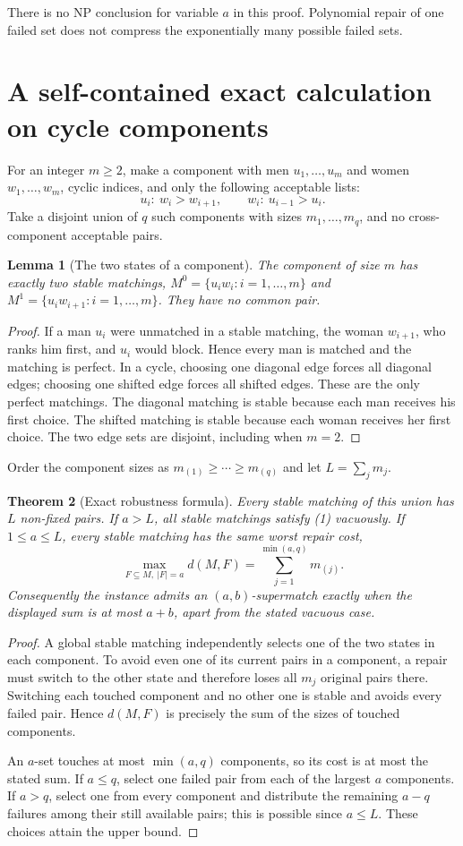 \documentclass[11pt,a4paper]{article}
\newtheorem{theorem}{Theorem}[section]
\newtheorem{lemma}[theorem]{Lemma}
\theoremstyle{definition}
\theoremstyle{remark}
\begin{document}
There is no NP conclusion for variable $a$ in this proof. Polynomial repair of one failed set does not compress the exponentially many possible failed sets.

\section{A self-contained exact calculation on cycle components}
For an integer $m\ge2$, make a component with men $u_1,\ldots,u_m$ and women $w_1,\ldots,w_m$, cyclic indices, and only the following acceptable lists:
\[
 u_i:\ w_i>w_{i+1},\qquad
 w_i:\ u_{i-1}>u_i.
\]
Take a disjoint union of $q$ such components with sizes $m_1,\ldots,m_q$, and no cross-component acceptable pairs.

\begin{lemma}[The two states of a component]
The component of size $m$ has exactly two stable matchings,
$M^0=\{u_iw_i:i=1,\ldots,m\}$ and
$M^1=\{u_iw_{i+1}:i=1,\ldots,m\}$.
They have no common pair.
\end{lemma}
\begin{proof}
If a man $u_i$ were unmatched in a stable matching, the woman $w_{i+1}$, who ranks him first, and $u_i$ would block. Hence every man is matched and the matching is perfect. In a cycle, choosing one diagonal edge forces all diagonal edges; choosing one shifted edge forces all shifted edges. These are the only perfect matchings. The diagonal matching is stable because each man receives his first choice. The shifted matching is stable because each woman receives her first choice. The two edge sets are disjoint, including when $m=2$.
\end{proof}

Order the component sizes as $m_{(1)}\ge\cdots\ge m_{(q)}$ and let $L=\sum_jm_j$.
\begin{theorem}[Exact robustness formula]
Every stable matching of this union has $L$ non-fixed pairs. If $a>L$, all stable matchings satisfy (1) vacuously. If $1\le a\le L$, every stable matching has the same worst repair cost,
\[
 \max_{F\subseteq M,\ |F|=a}d(M,F)
   =\sum_{j=1}^{\min(a,q)}m_{(j)}.
\]
Consequently the instance admits an $(a,b)$-supermatch exactly when the displayed sum is at most $a+b$, apart from the stated vacuous case.
\end{theorem}
\begin{proof}
A global stable matching independently selects one of the two states in each component. To avoid even one of its current pairs in a component, a repair must switch to the other state and therefore loses all $m_j$ original pairs there. Switching each touched component and no other one is stable and avoids every failed pair. Hence $d(M,F)$ is precisely the sum of the sizes of touched components.

An $a$-set touches at most $\min(a,q)$ components, so its cost is at most the stated sum. If $a\le q$, select one failed pair from each of the largest $a$ components. If $a>q$, select one from every component and distribute the remaining $a-q$ failures among their still available pairs; this is possible since $a\le L$. These choices attain the upper bound.
\end{proof}
\end{document}
